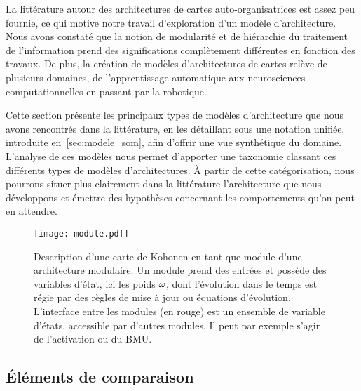 \documentclass[../main]{subfiles}
\begin{document}
La littérature autour des architectures de cartes auto-organisatrices est assez peu fournie, ce qui motive notre travail d'exploration d'un modèle d'architecture. 
Nous avons constaté que la notion de modularité et de hiérarchie du traitement de l'information prend des significations complètement différentes en fonction des travaux. De plus, la création de modèles d'architectures de cartes relève de plusieurs domaines, de l'apprentissage automatique aux neurosciences computationnelles en passant par la robotique.

Cette section présente les principaux types de modèles d'architecture que nous avons rencontrés dans la littérature, en les détaillant sous une notation unifiée, introduite en~\ref{sec:modele_som}, afin d'offrir une vue synthétique du domaine. L'analyse de ces modèles nous permet d'apporter une taxonomie classant ces différents types de modèles d'architectures. \`A partir de cette catégorisation, nous pourrons situer plus clairement dans la littérature l'architecture que nous développons et émettre des hypothèses concernant les comportements qu'on peut en attendre.

\begin{figure}
    \centering
    \texttt{[image: module.pdf]}
    \caption{Description d'une carte de Kohonen en tant que module d'une architecture modulaire. Un module prend des entrées et possède des variables d'état, ici les poids $\omega$, dont l'évolution dans le temps est régie par des règles de mise à jour ou équations d'évolution. L'interface entre les modules (en rouge) est un ensemble de variable d'états, accessible par d'autres modules. Il peut par exemple s'agir de l'activation ou du BMU. \label{fig:module}}
\end{figure}

\subsection{\'Eléments de comparaison}
\end{document}
